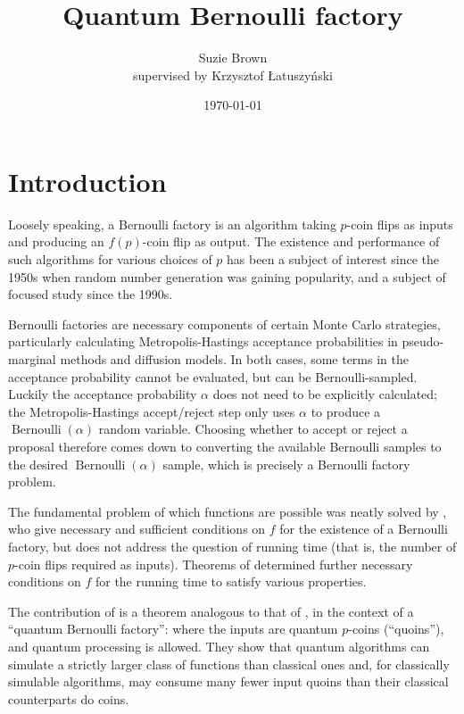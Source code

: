 \documentclass{article}
\title{Quantum Bernoulli factory}
\author{Suzie Brown \\ {\small supervised by Krzysztof \L atuszy\'nski}}
\date{\today}
\theoremstyle{definition}
\newcommand{\Bern}{\operatorname{Bernoulli}}
\begin{document}
\maketitle

\section{Introduction}
Loosely speaking, a Bernoulli factory is an algorithm taking $p$-coin flips as inputs and producing an $f(p)$-coin flip as output.
The existence and performance of such algorithms for various choices of $p$ has been a subject of interest since the 1950s when random number generation was gaining popularity, and a subject of focused study since the 1990s.

Bernoulli factories are necessary components of certain Monte Carlo strategies, particularly calculating Metropolis-Hastings acceptance probabilities in pseudo-marginal methods and diffusion models. 
In both cases, some terms in the acceptance probability cannot be evaluated, but can be Bernoulli-sampled. Luckily the acceptance probability $\alpha$ does not need to be explicitly calculated; the Metropolis-Hastings accept/reject step only uses $\alpha$ to produce a $\Bern(\alpha)$ random variable. Choosing whether to accept or reject a proposal therefore comes down to converting the available Bernoulli samples to the desired $\Bern(\alpha)$ sample, which is precisely a Bernoulli factory problem.

The fundamental problem of which functions are possible was neatly solved by \citet{keane1994}, who give necessary and sufficient conditions on $f$ for the existence of a Bernoulli factory, but does not address the question of running time (that is, the number of $p$-coin flips required as inputs).
Theorems of \citet{nacu2005} determined further necessary conditions on $f$ for the running time to satisfy various properties.

The contribution of \citet{dale2015} is a theorem analogous to that of \citet{keane1994}, in the context of a ``quantum Bernoulli factory'': where the inputs are quantum $p$-coins (``quoins''), and quantum processing is allowed.
They show that quantum algorithms can simulate a strictly larger class of functions than classical ones and, for classically simulable algorithms, may consume many fewer input quoins than their classical counterparts do coins.

\end{document}
